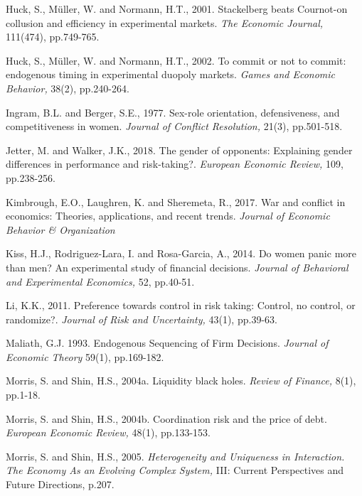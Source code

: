 \documentclass[11pt, letterpaper]{article}
\theoremstyle{plain}
\begin{document}
\begin{thebibliography}{10}
\bibitem{}Huck, S., M\"{u}ller, W. and Normann, H.T., 2001. Stackelberg beats Cournot-on collusion and efficiency in experimental markets. \textit{The Economic Journal,} 111(474), pp.749-765.

\bibitem{}Huck, S., M\"{u}ller, W. and Normann, H.T., 2002. To commit or not to commit: endogenous timing in experimental duopoly markets. \textit{Games and Economic Behavior,} 38(2), pp.240-264.

\bibitem{} Ingram, B.L. and Berger, S.E., 1977. Sex-role orientation, defensiveness, and competitiveness in women. \textit{Journal of Conflict Resolution,} 21(3), pp.501-518.

\bibitem{}Jetter, M. and Walker, J.K., 2018. The gender of opponents: Explaining gender differences in performance and risk-taking?. \textit{European Economic Review,} 109, pp.238-256.


\bibitem{} Kimbrough, E.O., Laughren, K. and Sheremeta, R., 2017. War and conflict in economics: Theories, applications, and recent trends. \textit{Journal of Economic Behavior \& Organization}

\bibitem{} Kiss, H.J., Rodriguez-Lara, I. and Rosa-Garcia, A., 2014. Do women panic more than men? An experimental study of financial decisions. \textit{Journal of Behavioral and Experimental Economics,} 52, pp.40-51.

\bibitem{} Li, K.K., 2011. Preference towards control in risk taking: Control, no control, or randomize?. \textit{Journal of Risk and Uncertainty,} 43(1), pp.39-63.



\bibitem{} Maliath, G.J. 1993. Endogenous Sequencing of Firm Decisions. \textit{Journal of Economic Theory} 59(1), pp.169-182. 

\bibitem{} Morris, S. and Shin, H.S., 2004a. Liquidity black holes. \textit{Review of Finance,} 8(1), pp.1-18.

\bibitem{}  Morris, S. and Shin, H.S., 2004b. Coordination risk and the price of debt. \textit{European Economic Review,} 48(1), pp.133-153.

\bibitem{} Morris, S. and Shin, H.S., 2005. \textit{Heterogeneity and Uniqueness in Interaction. The Economy As an Evolving Complex System,} III: Current Perspectives and Future Directions, p.207.


\end{thebibliography}
\end{document}
